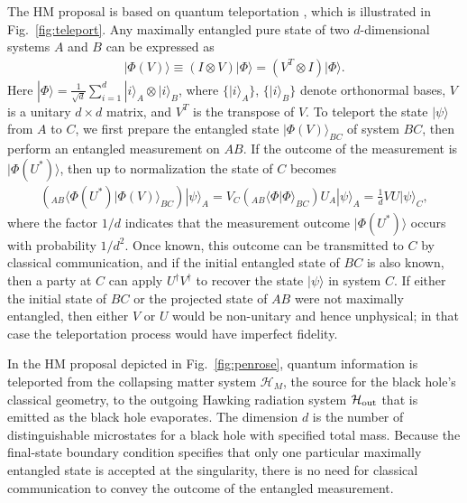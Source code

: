 \documentclass[11pt]{article}
\begin{document}
The HM proposal is based on quantum teleportation \cite{teleportation}, which is illustrated in Fig.~\ref{fig:teleport}. Any maximally entangled pure state of two $d$-dimensional systems $A$ and $B$ can be expressed as 
\begin{eqnarray}
|\Phi(V)\rangle\equiv \left(I\otimes V \right)|\Phi\rangle= \left(V^T\otimes I\right)|\Phi\rangle.
\end{eqnarray}
Here $|\Phi\rangle = \frac{1}{\sqrt{d}}\sum_{i=1}^d |i\rangle_A\otimes |i\rangle_B$, where $\{|i\rangle_A\}$, $\{|i\rangle_B\}$ denote orthonormal bases, $V$ is a unitary $d\times d$ matrix, and $V^T$ is the transpose of $V$. To teleport the state $|\psi\rangle$ from $A$ to $C$, we first prepare the entangled state $|\Phi(V)\rangle_{BC}$ of system $BC$, then perform an entangled measurement on $AB$. If the outcome of the measurement is $|\Phi(U^*)\rangle$, then up to normalization the state of $C$ becomes
\begin{eqnarray}
\left({}_{AB}\langle \Phi(U^*) |\Phi(V)\rangle_{BC}\right)|\psi\rangle_A = V_C\left({}_{AB}\langle \Phi |\Phi\rangle_{BC}\right)U_A|\psi\rangle_A = \frac{1}{d}VU|\psi\rangle_C,
\end{eqnarray}
where the factor $1/d$ indicates that the measurement outcome $|\Phi(U^*)\rangle$ occurs with probability $1/d^2$. Once known, this outcome can be transmitted to $C$ by classical communication, and if the initial entangled state of $BC$ is also known, then a party at $C$ can apply $U^\dagger V^\dagger$ to recover the state $|\psi\rangle$ in system $C$. If either the initial state of $BC$ or the projected state of $AB$ were not maximally entangled, then either $V$ or $U$ would be non-unitary and hence unphysical; in that case the teleportation process would have imperfect fidelity.

In the HM proposal depicted in Fig.~\ref{fig:penrose}, quantum information is teleported from the collapsing matter system $\mathcal{H}_M$, the source for the black hole's classical geometry, to the outgoing Hawking radiation system $\mathcal{H}_{\rm out}$ that is emitted as the black hole evaporates. The dimension $d$ is the number of distinguishable microstates for a black hole with specified total mass. Because the final-state boundary condition specifies that only one particular maximally entangled state is accepted at the singularity, there is no need for classical communication to convey the outcome of the entangled measurement.
\end{document}

